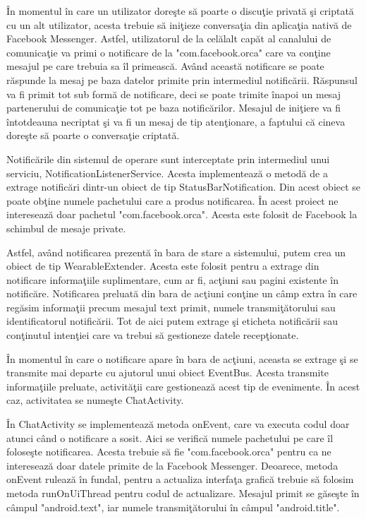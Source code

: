 \^{I}n momentul \^{i}n care un utilizator dore\c{s}te s\u{a} poarte o discu\c{t}ie privat\u{a} \c{s}i criptat\u{a} cu un alt utilizator, acesta trebuie s\u{a} ini\c{t}ieze conversa\c{t}ia din aplica\c{t}ia nativ\u{a} de Facebook Messenger. Astfel, utilizatorul de la cel\u{a}lalt cap\u{a}t al canalului de comunica\c{t}ie va primi o notificare de la "com.facebook.orca" care va con\c{t}ine mesajul pe care trebuia sa \^{i}l primeasc\u{a}. Av\^{a}nd aceast\u{a} notificare se poate r\u{a}spunde la mesaj pe baza datelor primite prin intermediul notific\u{a}rii. R\u{a}spunsul va fi primit tot sub form\u{a} de notificare, deci se poate trimite \^{i}napoi un mesaj partenerului de comunica\c{t}ie tot pe baza notific\u{a}rilor. Mesajul de ini\c{t}iere va fi \^{i}ntotdeauna necriptat \c{s}i va fi un mesaj de tip aten\c{t}ionare, a faptului c\u{a} cineva dore\c{s}te s\u{a} poarte o conversa\c{t}ie criptat\u{a}.

Notific\u{a}rile din sistemul de operare sunt interceptate prin intermediul unui serviciu, NotificationListenerService. Acesta implementeaz\u{a} o metod\u{a} de a extrage notific\u{a}ri dintr-un obiect de tip StatusBarNotification. Din acest obiect se poate ob\c{t}ine numele pachetului care a produs notificarea. \^{I}n acest proiect ne intereseaz\u{a} doar pachetul "com.facebook.orca". Acesta este folosit de Facebook la schimbul de mesaje private. 

Astfel, av\^{a}nd notificarea prezent\u{a} \^{i}n bara de stare a sistemului, putem crea un obiect de tip WearableExtender. Acesta este folosit pentru a extrage din notificare informa\c{t}iile suplimentare, cum ar fi, ac\c{t}iuni sau pagini existente \^{i}n notific\u{a}re. Notificarea preluat\u{a} din bara de ac\c{t}iuni con\c{t}ine un c\^{a}mp extra \^{i}n care reg\u{a}sim informa\c{t}ii precum mesajul text primit, numele transmi\c{t}\u{a}torului sau identificatorul notific\u{a}rii. Tot de aici putem extrage \c{s}i eticheta notific\u{a}rii sau con\c{t}inutul inten\c{t}iei care va trebui s\u{a} gestioneze datele recep\c{t}ionate.

\^{I}n momentul \^{i}n care o notificare apare \^{i}n bara de ac\c{t}iuni, aceasta se extrage \c{s}i se transmite mai departe cu ajutorul unui obiect EventBus. Acesta transmite informa\c{t}iile preluate, activit\u{a}\c{t}ii care gestioneaz\u{a} acest tip de evenimente. \^{I}n acest caz, activitatea se nume\c{s}te ChatActivity.

\^{I}n ChatActivity se implementeaz\u{a} metoda onEvent, care va executa codul doar atunci c\^{a}nd o notificare a sosit. Aici se verific\u{a} numele pachetului pe care \^{i}l folose\c{s}te notificarea. Acesta trebuie s\u{a} fie "com.facebook.orca" pentru ca ne intereseaz\u{a} doar datele primite de la Facebook Messenger. Deoarece, metoda onEvent ruleaz\u{a} \^{i}n fundal, pentru a actualiza interfa\c{t}a grafic\u{a} trebuie s\u{a} folosim metoda runOnUiThread pentru codul de actualizare. Mesajul primit se g\u{a}se\c{s}te \^{i}n c\^{a}mpul "android.text", iar numele transmi\c{t}\u{a}torului \^{i}n c\^{a}mpul "android.title".

